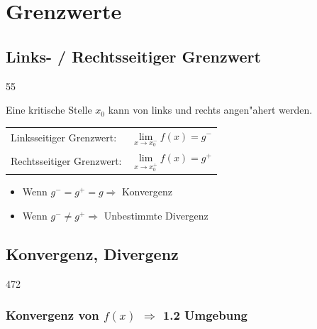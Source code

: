 \section{Grenzwerte}

\subsection{Links- / Rechtsseitiger Grenzwert}{55}

Eine kritische Stelle $x_0$ kann von links und rechts angen"ahert werden.
		
\renewcommand{\arraystretch}{1.7}
\begin{tabular}{ll}
	Linksseitiger Grenzwert: 	& $\lim\limits_{x \to x_0^-} f(x) = g^-$ \\
	Rechtsseitiger Grenzwert: 	& $\lim\limits_{x \to x_0^+} f(x) = g^+$ \\
\end{tabular}
\renewcommand{\arraystretch}{1}
\vspace{0.1cm}

\begin{itemize}
	\item Wenn $g^- = g^+ = g \Rightarrow$ Konvergenz 
	\item Wenn $g^- \neq g^+ \Rightarrow$ Unbestimmte Divergenz
\end{itemize}

\subsection{Konvergenz, Divergenz}{472}

\subsubsection{Konvergenz von $f(x)$ \hspace{0.3cm}\texorpdfstring{$\Rightarrow$}{→} \hspace{0.3cm}1.2 Umgebung}
		
